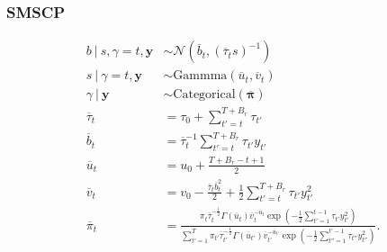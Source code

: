 \subsubsection{SMSCP}
\small
\begin{align*}
    b \:|\: s, \gamma = t, \mathbf{y} &\sim \mathcal{N}(\overline{b}_t, (\overline{\tau}_t s)^{-1}) \\
    s \:|\: \gamma = t, \mathbf{y} &\sim \text{Gammma}(\overline{u}_t, \overline{v}_t) \\
    \gamma \:|\: \mathbf{y} &\sim \text{Categorical}(\overline{\pmb{\pi}}) \\
    \overline{\tau}_t &= \tau_0 + \sum_{t' = t}^{T+B_r} \tau_{t'}  \\
    \overline{b}_t &= \overline{\tau}^{-1}_t \sum_{t'=t}^{T+B_r} \tau_{t'} y_{t'} \\
    \overline{u}_t &= u_0 + \frac{T +B_r- t + 1}{2} \\
    \overline{v}_t &= v_0 - \frac{\overline{\tau}_t\overline{b}^2_t}{2} + \frac{1}{2} \sum_{t'=t}^{T+B_r} \tau_{t'}y_{t'}^2 \\
    \overline{\pi}_t &= \frac{\pi_t\overline{\tau}_t^{-\frac{1}{2}} \Gamma(\overline{u}_t) \overline{v}_t^{-\overline{u}_t}\exp\left(- \frac{1}{2}\sum_{t'=1}^{t-1} \tau_{t'}y^2_{t'}\right)}{\sum_{t'=1}^T\pi_{t'}\overline{\tau}_{t'}^{-\frac{1}{2}} \Gamma(\overline{u}_{t'}) \overline{v}_{t'}^{-\overline{u}_{t'}}\exp\left(- \frac{1}{2}\sum_{t''=1}^{t'-1} \tau_{t''}y^2_{t''}\right)}.
\end{align*}
\normalsize
